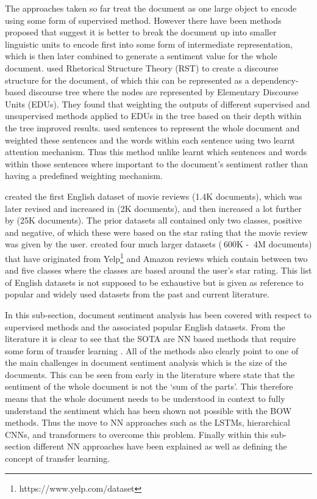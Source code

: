 The approaches taken so far treat the document as one large object to encode using some form of supervised method. However there have been methods proposed that suggest it is better to break the document up into smaller linguistic units to encode first into some form of intermediate representation, which is then later combined to generate a sentiment value for the whole document. \citet{bhatia-etal-2015-better} used Rhetorical Structure Theory (RST) \citep{mann-1984-discourse} to create a discourse structure for the document, of which this can be represented as a dependency-based discourse tree where the nodes are represented by Elementary Discourse Units (EDUs). They found that weighting the outputs of different supervised and unsupervised methods applied to EDUs in the tree based on their depth within the tree improved results. \citet{yang-etal-2016-hierarchical} used sentences to represent the whole document and weighted these sentences and the words within each sentence using two learnt attention mechanism. Thus this method unlike \citet{bhatia-etal-2015-better} learnt which sentences and words within those sentences where important to the document's sentiment rather than having a predefined weighting mechanism.

\citet{pang-etal-2002-thumbs} created the first English dataset of movie reviews (1.4K documents), which was later revised and increased in \citet{pang-lee-2004-sentimental} (2K documents), and then increased a lot further by \citet{maas-etal-2011-learning} (25K documents). The prior datasets all contained only two classes, positive and negative, of which these were based on the star rating that the movie review was given by the user. \citet{zhang2015character} created four much larger datasets ($~600$K - $~4$M documents) that have originated from Yelp\footnote{https://www.yelp.com/dataset} and Amazon reviews \citep{mcauley2015image} which contain between two and five classes where the classes are based around the user's star rating. This list of English datasets is not supposed to be exhaustive but is given as reference to popular and widely used datasets from the past and current literature.

In this sub-section, document sentiment analysis has been covered with respect to supervised methods and the associated popular English datasets. From the literature it is clear to see that the SOTA are NN based methods that require some form of transfer learning \citep{yang2019xlnet}. All of the methods also clearly point to one of the main challenges in document sentiment analysis which is the size of the documents. This can be seen from early in the literature where  \citet{turney-2002-thumbs} state that the sentiment of the whole document is not the `sum of the parts'. This therefore means that the whole document needs to be understood in context to fully understand the sentiment which has been shown not possible with the BOW methods. Thus the move to NN approaches such as the LSTMs, hierarchical CNNs, and transformers to overcome this problem. Finally within this sub-section different NN approaches have been explained as well as defining the concept of transfer learning.

